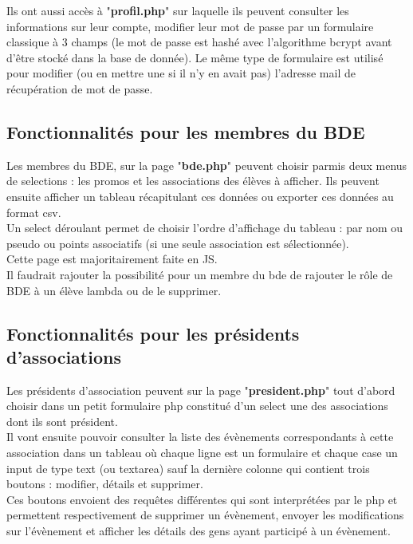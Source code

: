 \documentclass[french]{article}
\begin{document}
	Ils ont aussi accès à "\textbf{profil.php}" sur laquelle ils peuvent consulter les informations sur leur compte, modifier leur mot de passe par un formulaire classique à 3 champs (le mot de passe est hashé avec l'algorithme bcrypt avant d'être stocké dans la base de donnée). Le même type de formulaire est utilisé pour modifier (ou en mettre une si il n'y en avait pas) l'adresse mail de récupération de mot de passe.
	
\subsection{Fonctionnalités pour les membres du BDE}
	Les membres du BDE, sur la page "\textbf{bde.php}" peuvent choisir parmis deux menus de selections : les promos et les associations des élèves à afficher. Ils peuvent ensuite afficher un tableau récapitulant ces données ou exporter ces données au format csv.\\ Un select déroulant permet de choisir l'ordre d'affichage du tableau : par nom ou pseudo ou points associatifs (si une seule association est sélectionnée).\\
	
	Cette page est majoritairement faite en JS. \\
	
	Il faudrait rajouter la possibilité pour un membre du bde de rajouter le rôle de BDE à un élève lambda ou de le supprimer.

\subsection{Fonctionnalités pour les présidents d'associations}	
	Les présidents d'association peuvent sur la page "\textbf{president.php}" tout d'abord choisir dans un petit formulaire php constitué d'un select une des associations dont ils sont président.\\
	
	Il vont ensuite pouvoir consulter la liste des évènements correspondants à cette association dans un tableau où chaque ligne est un formulaire et chaque case un input de type text (ou textarea) sauf la dernière colonne qui contient trois boutons : modifier, détails et supprimer.\\
	
	Ces boutons envoient des requêtes différentes qui sont interprétées par le php et permettent respectivement de supprimer un évènement, envoyer les modifications sur l'évènement et afficher les détails des gens ayant participé à un évènement. \\
	
\end{document}
